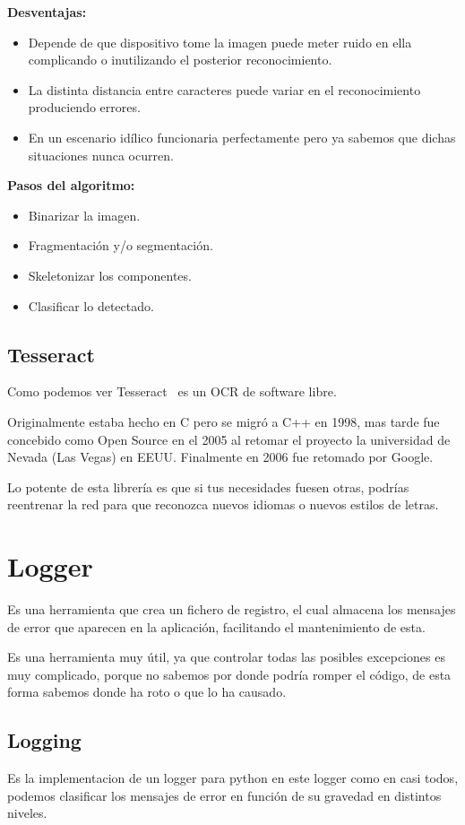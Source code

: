 \textbf{Desventajas:}
\begin{itemize}
\item Depende de que dispositivo tome la imagen puede meter ruido en ella complicando o inutilizando el posterior reconocimiento.
\item La distinta distancia entre caracteres puede variar en el reconocimiento produciendo errores.
\item En un escenario idílico funcionaria perfectamente pero ya sabemos que dichas situaciones nunca ocurren.
\end{itemize}

\textbf{Pasos del algoritmo:}
\begin{itemize}
\item Binarizar la imagen.
\item Fragmentación y/o segmentación.
\item Skeletonizar los componentes.
\item Clasificar lo detectado.
\end{itemize}

\subsection{Tesseract}
Como podemos ver Tesseract~\cite{wiki:Tesseract} es un OCR de software libre.

Originalmente estaba hecho en C pero se migró a C++ en 1998, mas tarde fue concebido como Open Source en el 2005 al retomar el proyecto la universidad de Nevada (Las Vegas) en EEUU. Finalmente en 2006 fue retomado por Google.

Lo potente de esta librería es que si tus necesidades fuesen otras, podrías reentrenar la red para que reconozca nuevos idiomas o nuevos estilos de letras.

\section{Logger}
Es una herramienta que crea un fichero de registro, el cual almacena los mensajes de error que aparecen en la aplicación, facilitando el mantenimiento de esta.

Es una herramienta muy útil, ya que controlar todas las posibles excepciones es muy complicado, porque no sabemos por donde podría romper el código, de esta forma sabemos donde ha roto o que lo ha causado.

\subsection{Logging}
Es la implementacion de un logger para python \cite{python:logger} en este logger como en casi todos, podemos clasificar los mensajes de error en función de su gravedad en distintos niveles.

